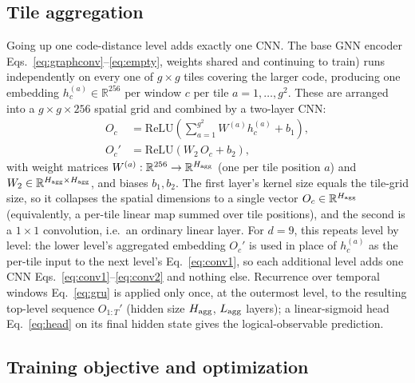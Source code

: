 \documentclass[aps,prxquantum,twocolumn,superscriptaddress,nofootinbib]{revtex4-2}
\begin{document}
\subsection{Tile aggregation}

Going up one code-distance level adds exactly one CNN. The base GNN encoder Eqs.~\eqref{eq:graphconv}--\eqref{eq:empty}, weights shared and continuing to train) runs independently on every one of $g\times g$ tiles covering the larger code, producing one embedding $h_c^{(a)} \in \mathbb{R}^{256}$ per window $c$ per tile $a = 1, \ldots, g^2$. These are arranged into a $g \times g \times 256$ spatial grid and combined by a two-layer CNN:
\begin{align}
O_c &= \mathrm{ReLU}\!\left( \sum_{a=1}^{g^2} W^{(a)} h_c^{(a)} + b_1 \right), \label{eq:conv1}\\
O_c' &= \mathrm{ReLU}\!\left(W_2\, O_c + b_2\right), \label{eq:conv2}
\end{align}
with weight matrices $W^{(a)}: \mathbb{R}^{256} \to \mathbb{R}^{H_{\rm agg}}$ (one per tile position $a$) and $W_2 \in \mathbb{R}^{H_{\rm agg} \times H_{\rm agg}}$, and biases $b_1, b_2$. The first layer's kernel size equals the tile-grid size, so it collapses the spatial dimensions to a single vector $O_c \in \mathbb{R}^{H_{\rm agg}}$ (equivalently, a per-tile linear map summed over tile positions), and the second is a $1\times1$ convolution, i.e.\ an ordinary linear layer. For $d = 9$, this repeats level by level: the lower level's aggregated embedding $O_c'$ is used in place of $h_c^{(a)}$ as the per-tile input to the next level's Eq.~\eqref{eq:conv1}, so each additional level adds one CNN Eqs.~\eqref{eq:conv1}--\eqref{eq:conv2} and nothing else. Recurrence over temporal windows Eq.~\eqref{eq:gru} is applied only once, at the outermost level, to the resulting top-level sequence $O_{1:T}'$ (hidden size $H_{\rm agg}$, $L_{\rm agg}$ layers); a linear-sigmoid head Eq.~\eqref{eq:head} on its final hidden state gives the logical-observable prediction.

\subsection{Training objective and optimization}
\end{document}
